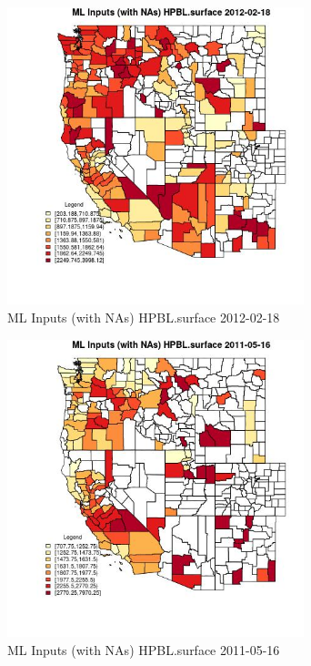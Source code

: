 \begin{figure} 
\centering  
\includegraphics[width=0.77\textwidth]{Code_Outputs/Report_ML_input_PM25_Step4_part_f_de_duplicated_aveswNAs_CountyHPBLsurfaceMean2012-02-18.jpg} 
\caption{\label{fig:Report_ML_input_PM25_Step4_part_f_de_duplicated_aveswNAsCountyHPBLsurfaceMean2012-02-18}ML Inputs (with NAs) HPBL.surface 2012-02-18} 
\end{figure} 
 

\begin{figure} 
\centering  
\includegraphics[width=0.77\textwidth]{Code_Outputs/Report_ML_input_PM25_Step4_part_f_de_duplicated_aveswNAs_CountyHPBLsurfaceMean2011-05-16.jpg} 
\caption{\label{fig:Report_ML_input_PM25_Step4_part_f_de_duplicated_aveswNAsCountyHPBLsurfaceMean2011-05-16}ML Inputs (with NAs) HPBL.surface 2011-05-16} 
\end{figure} 
 

